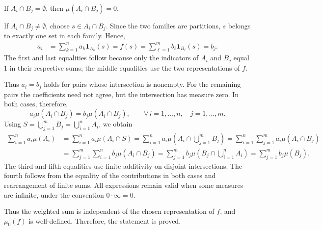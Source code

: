 \par\noindent{}\par\nobreak
 If $A_i\cap B_j=\emptyset$, then
$\mu(A_i\cap B_j)=0$.

\par\noindent{}\par\nobreak
 If $A_i\cap B_j\neq\emptyset$,
choose $s\in A_i\cap B_j$. Since the two families are partitions, $s$
belongs to exactly one set in each family. Hence,
\[
\begin{aligned}
a_i&=\sum_{k=1}^{n}a_k\mathbf1_{A_k}(s) =f(s) =\sum_{\ell=1}^{m}b_\ell\mathbf1_{B_\ell}(s) =b_j.
\end{aligned}
\]
The first and last equalities follow because only the indicators of $A_i$
and $B_j$ equal $1$ in their respective sums; the middle equalities use the
two representations of $f$.

Thus $a_i=b_j$ holds for pairs whose intersection is nonempty. For the
remaining pairs the coefficients need not agree, but the intersection has
measure zero. In both cases, therefore,
\[
a_i\mu(A_i\cap B_j)=b_j\mu(A_i\cap B_j),
\qquad\forall\,i=1,\ldots,n,\quad j=1,\ldots,m.
\]
Using $S=\bigcup_{j=1}^{m}B_j=\bigcup_{i=1}^{n}A_i$, we obtain
\[
\begin{aligned}
\sum_{i=1}^{n}a_i\mu(A_i)&=\sum_{i=1}^{n}a_i\mu(A_i\cap S) =\sum_{i=1}^{n}a_i\mu\left(A_i\cap\bigcup_{j=1}^{m}B_j\right) =\sum_{i=1}^{n}\sum_{j=1}^{m}a_i\mu(A_i\cap B_j)\\
&=\sum_{j=1}^{m}\sum_{i=1}^{n}b_j\mu(A_i\cap B_j) =\sum_{j=1}^{m}b_j\mu\left(B_j\cap\bigcup_{i=1}^{n}A_i\right) =\sum_{j=1}^{m}b_j\mu(B_j).
\end{aligned}
\]
The third and fifth equalities use finite additivity on disjoint intersections. The fourth follows from the equality of the contributions in both cases and rearrangement of finite sums. All expressions remain valid when some measures are infinite, under the convention $0\cdot\infty=0$.

Thus the weighted sum is independent of the chosen representation of $f$, and $\mu_0(f)$ is well-defined. Therefore, the statement is proved.
